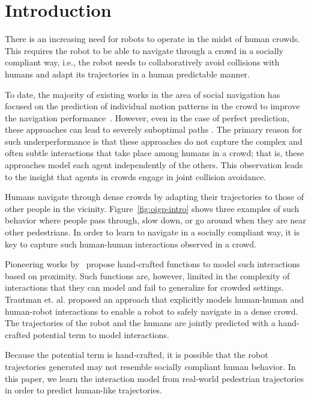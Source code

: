 \section{Introduction}
\label{sec:oigp-introduction}

There is an increasing need for robots to operate in the midst of
human crowds. This requires the robot to be able to navigate through a
crowd in a socially compliant way, i.e., the robot needs to
collaboratively avoid collisions with humans and adapt its
trajectories in a human predictable manner.

To date, the majority of existing works in the area of social
navigation has focused on the prediction of individual motion patterns
in the crowd to improve the navigation performance~\cite{thompson09,
  bennewitz05, large04}. However, even in the case of perfect
prediction, these approaches can lead to
severely suboptimal paths \cite{trautman10}.
The primary reason for such underperformance is that these approaches
do not capture the complex and often subtle interactions that take
place among humans in a crowd; that is, these approaches model each
agent independently of the others. This observation leads to the
insight that agents in crowds engage in joint collision avoidance.

Humans navigate through dense crowds by adapting their trajectories
to those of other people in the vicinity.
Figure~\ref{fig:oigp-intro} shows three examples of such behavior where
people pass through, slow down, or go around when they are near
other pedestrians.
In order to learn to navigate in a socially compliant way, it is key
to capture such human-human interactions observed in a crowd.

Pioneering works by~\cite{helbing95,hall63} propose hand-crafted
functions to model such interactions based on proximity. Such
functions are, however, limited in the complexity of interactions that
they can model and fail to generalize for crowded settings. Trautman
et. al. \cite{trautman10} proposed an approach that explicitly models
human-human and human-robot interactions to enable a robot to safely
navigate in a dense crowd. The trajectories of the robot and the
humans are jointly predicted with a hand-crafted potential term to
model interactions.

Because the potential term is hand-crafted, it is possible that the
robot trajectories generated may not resemble socially compliant human
behavior.  In this paper, we learn the interaction model from
real-world pedestrian trajectories in order to predict human-like
trajectories.


